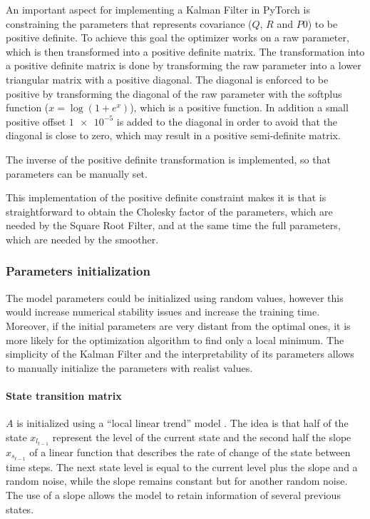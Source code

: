 \documentclass{article}
\begin{document}
An important aspect for implementing a Kalman Filter in PyTorch is constraining the parameters that represents covariance ($Q$, $R$ and $P0$) to be positive definite. To achieve this goal the optimizer works on a raw parameter, which is then transformed into a positive definite matrix.
The transformation into a positive definite matrix is done by transforming the raw parameter into a lower triangular matrix with a positive diagonal. The diagonal is enforced to be positive by transforming the diagonal of the raw parameter with the softplus function ($x = \log (1 + e^{x})$), which is a positive function.
 In addition a small positive offset $\num{1e-5}$ is added to the diagonal in order to avoid that the diagonal is close to zero, which may result in a positive semi-definite matrix.

The inverse of the positive definite transformation is implemented, so that parameters can be manually set.

This implementation of the positive definite constraint makes it is that is straightforward to obtain the Cholesky factor of the parameters, which are needed by the Square Root Filter, and at the same time the full parameters, which are needed by the smoother.

\subsubsection{Parameters initialization}

The model parameters could be initialized using random values, however this would increase numerical stability issues and increase the training time. Moreover, if the initial parameters are very distant from the optimal ones, it is more likely for the optimization algorithm to find only a local minimum.  The simplicity of the Kalman Filter and the interpretability of its parameters allows to manually initialize the parameters with realist values.

\paragraph{State transition matrix} $A$ is initialized using a ``local linear trend'' model \cite{durbin_time_2012-1}. The idea is that half of the state $x_{l_{t-1}}$ represent the level of the current state and the second half the slope $x_{s_{t-1}}$ of a linear function that describes the rate of change of the state between time steps. The next state level is equal to the current level plus the slope and a random noise, while the slope remains constant but for another random noise. The use of a slope allows the model to retain information of several previous states.
\end{document}
